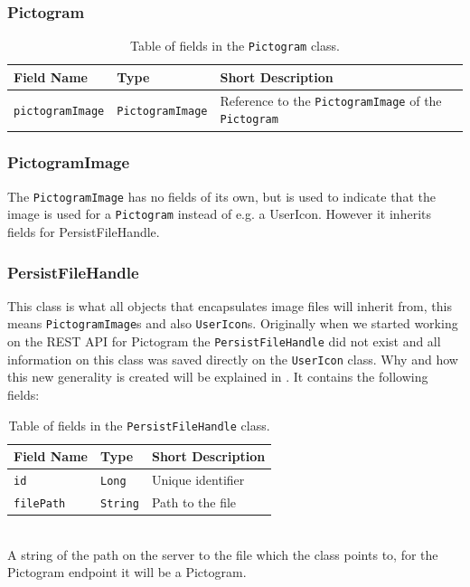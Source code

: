 \subsubsection*{Pictogram}

\begin{table}[H]
    \footnotesize
    \centering
    \begin{tabularx}{\textwidth}{ l l X }
        Field Name    & Type                                & Short Description                                \\
        \midrule
        \texttt{pictogramImage}        & \texttt{PictogramImage}       & Reference to the \texttt{PictogramImage} of the \texttt{Pictogram}\\
    \end{tabularx}
    \caption{Table of fields in the \texttt{Pictogram} class.}
    \label{tbl:pictogram_class}
\end{table}

\subsubsection*{PictogramImage}
The \texttt{PictogramImage} has no fields of its own, but is used to indicate that the image is used for a \texttt{Pictogram} instead of e.g. a UserIcon.
However it inherits fields for PersistFileHandle.

\subsubsection*{PersistFileHandle}
This class is what all objects that encapsulates image files will inherit from, this means \texttt{PictogramImage}s and also \texttt{UserIcon}s.
Originally when we started working on the REST API for Pictogram the \texttt{PersistFileHandle} did not exist and all information on this class was saved directly on the \texttt{UserIcon} class.
Why and how this new generality is created will be explained in .
It contains the following fields:
\begin{table}[!h]
    \footnotesize
    \centering
    \begin{tabularx}{\textwidth}{ l X X }
        Field Name    & Type                                & Short Description                                \\
        \midrule
        \texttt{id}        & \texttt{Long}       & Unique identifier\\
        \texttt{filePath}        & \texttt{String}       & Path to the file\\
    \end{tabularx}
    \caption{Table of fields in the \texttt{PersistFileHandle} class.}
    \label{tbl:persistfilehandle_class}
\end{table}
\begin{description}[font=\ttfamily\bfseries]
    \item[filePath] \hfill \\ A string of the path on the server to the file which the class points to, for the Pictogram endpoint it will be a Pictogram.
\end{description}

